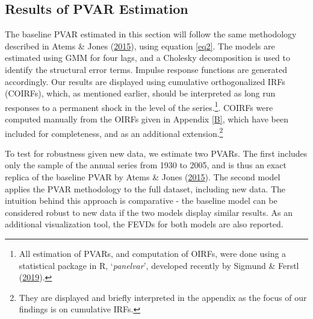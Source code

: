 \documentclass[11pt,preprint, authoryear]{elsarticle}
\numberwithin{equation}{section}
\numberwithin{figure}{section}
\numberwithin{table}{section}
\let\rmarkdownfootnote\footnote%
\def\footnote{\protect\rmarkdownfootnote}
\begin{document}
\hypertarget{results-of-pvar-estimation}{%
\subsection{\texorpdfstring{Results of PVAR Estimation
\label{Section 3.3}}{Results of PVAR Estimation }}\label{results-of-pvar-estimation}}

The baseline PVAR estimated in this section will follow the same
methodology described in Atems \& Jones
(\protect\hyperlink{ref-atems}{2015}), using equation \ref{eq2}. The
models are estimated using GMM for four lags, and a Cholesky
decomposition is used to identify the structural error terms. Impulse
response functions are generated accordingly. Our results are displayed
using cumulative orthogonalized IRFs (COIRFs), which, as mentioned
earlier, should be interpreted as long run responses to a permanent
shock in the level of the series.\footnote{All estimation of PVARs, and
  computation of OIRFs, were done using a statistical package in R,
  `\emph{panelvar}', developed recently by Sigmund \& Ferstl
  (\protect\hyperlink{ref-sigmund2019panel}{2019}).}. COIRFs were
computed manually from the OIRFs given in Appendix \ref{B}, which have
been included for completeness, and as an additional
extension.\footnote{They are displayed and briefly interpreted in the
  appendix as the focus of our findings is on cumulative IRFs.}

To test for robustness given new data, we estimate two PVARs. The first
includes only the sample of the annual series from 1930 to 2005, and is
thus an exact replica of the baseline PVAR by Atems \& Jones
(\protect\hyperlink{ref-atems}{2015}). The second model applies the PVAR
methodology to the full dataset, including new data. The intuition
behind this approach is comparative - the baseline model can be
considered robust to new data if the two models display similar results.
As an additional visualization tool, the FEVDs for both models are also
reported.
\end{document}
